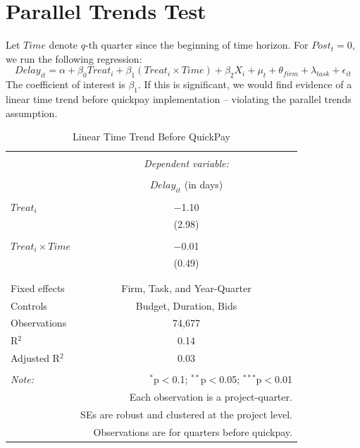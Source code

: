 \documentclass[
]{article}
\begin{document}
\hypertarget{parallel-trends-test}{%
\section{Parallel Trends Test}\label{parallel-trends-test}}

Let \(Time\) denote \(q\)-th quarter since the beginning of time
horizon. For \(Post_t =0\), we run the following regression:
\[ Delay_{it} = \alpha+\beta_0 Treat_i + \beta_1 (Treat_i \times Time) + \beta_2 X_i + \mu_t + \theta_{firm} + \lambda_{task} +\epsilon_{it}\]
The coefficient of interest is \(\beta_1\). If this is significant, we
would find evidence of a linear time trend before quickpay
implementation -- violating the parallel trends assumption.

\begin{table}[H] \centering 
  \caption{Linear Time Trend Before QuickPay} 
  \label{} 
\small 
\begin{tabular}{@{\extracolsep{5pt}}lc} 
\\[-1.8ex]\hline 
\hline \\[-1.8ex] 
 & \multicolumn{1}{c}{\textit{Dependent variable:}} \\ 
\cline{2-2} 
\\[-1.8ex] & $Delay_{it}$ (in days) \\ 
\hline \\[-1.8ex] 
 $Treat_i$ & $-$1.10 \\ 
  & (2.98) \\ 
  & \\ 
 $Treat_i \times Time$ & $-$0.01 \\ 
  & (0.49) \\ 
  & \\ 
\hline \\[-1.8ex] 
Fixed effects & Firm, Task, and Year-Quarter \\ 
Controls & Budget, Duration, Bids \\ 
Observations & 74,677 \\ 
R$^{2}$ & 0.14 \\ 
Adjusted R$^{2}$ & 0.03 \\ 
\hline 
\hline \\[-1.8ex] 
\textit{Note:}  & \multicolumn{1}{r}{$^{*}$p$<$0.1; $^{**}$p$<$0.05; $^{***}$p$<$0.01} \\ 
 & \multicolumn{1}{r}{Each observation is a project-quarter.} \\ 
 & \multicolumn{1}{r}{SEs are robust and clustered at the project level.} \\ 
 & \multicolumn{1}{r}{Observations are for quarters before quickpay.} \\ 
\end{tabular} 
\end{table}
\end{document}
